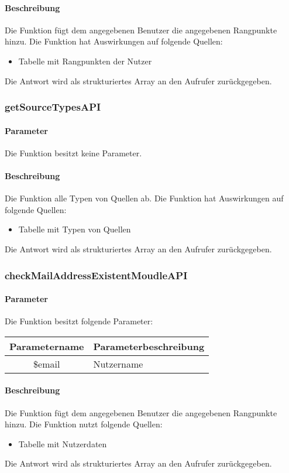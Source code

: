\paragraph{Beschreibung} Die Funktion fügt dem angegebenen Benutzer die angegebenen Rangpunkte hinzu. Die Funktion hat Auswirkungen auf folgende Quellen:
\begin{itemize}
	\item Tabelle mit Rangpunkten der Nutzer
\end{itemize}
Die Antwort wird als strukturiertes Array an den Aufrufer zurückgegeben.
\subsubsection{getSourceTypesAPI}
\paragraph{Parameter} Die Funktion besitzt keine Parameter.
\paragraph{Beschreibung} Die Funktion alle Typen von Quellen ab. Die Funktion hat Auswirkungen auf folgende Quellen:
\begin{itemize}
	\item Tabelle mit Typen von Quellen
\end{itemize}
Die Antwort wird als strukturiertes Array an den Aufrufer zurückgegeben.
\subsubsection{checkMailAddressExistentMoudleAPI}
\paragraph{Parameter} Die Funktion besitzt folgende Parameter:
\begin{table}[H]
	\begin{tabular}{|c|p{11cm}|}
		\hline
		\textbf{Parametername} & \textbf{Parameterbeschreibung} \\ \hline
		\$email & Nutzername \\ \hline
	\end{tabular}
\end{table}
\paragraph{Beschreibung} Die Funktion fügt dem angegebenen Benutzer die angegebenen Rangpunkte hinzu. Die Funktion nutzt folgende Quellen:
\begin{itemize}
	\item Tabelle mit Nutzerdaten
\end{itemize}
Die Antwort wird als strukturiertes Array an den Aufrufer zurückgegeben.